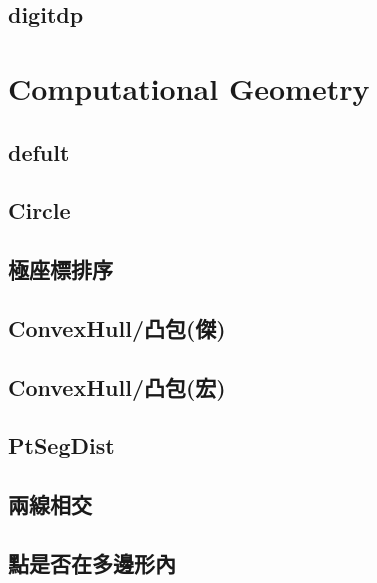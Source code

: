 \documentclass[a4paper,10pt,twocolumn,oneside]{article}
\begin{document}
    \subsection{digitdp}
    


\section{Computational Geometry}
    \subsection{defult}
    

    \subsection{Circle}
    

    \subsection{極座標排序}
    

    \subsection{ConvexHull/凸包(傑)}
    

    \subsection{ConvexHull/凸包(宏)}
    

    \subsection{PtSegDist}
    

    \subsection{兩線相交}
    

    \subsection{點是否在多邊形內}
    
    
\end{document}
